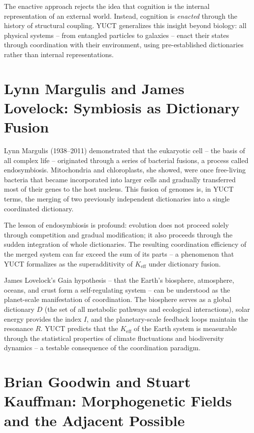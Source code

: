 \documentclass[12pt,a4paper]{article}
\begin{document}
	The enactive approach rejects the idea that cognition is the internal representation of an external world. Instead, cognition is \emph{enacted} through the history of structural coupling. YUCT generalizes this insight beyond biology: all physical systems -- from entangled particles to galaxies -- enact their states through coordination with their environment, using pre-established dictionaries rather than internal representations.
	
	\section{Lynn Margulis and James Lovelock: Symbiosis as Dictionary Fusion}
	
	Lynn Margulis (1938–2011) demonstrated that the eukaryotic cell -- the basis of all complex life -- originated through a series of bacterial fusions, a process called endosymbiosis. Mitochondria and chloroplasts, she showed, were once free-living bacteria that became incorporated into larger cells and gradually transferred most of their genes to the host nucleus. This fusion of genomes is, in YUCT terms, the merging of two previously independent dictionaries into a single coordinated dictionary.
	
	The lesson of endosymbiosis is profound: evolution does not proceed solely through competition and gradual modification; it also proceeds through the sudden integration of whole dictionaries. The resulting coordination efficiency of the merged system can far exceed the sum of its parts -- a phenomenon that YUCT formalizes as the superadditivity of \(K_{\mathrm{eff}}\) under dictionary fusion.
	
	James Lovelock's Gaia hypothesis -- that the Earth's biosphere, atmosphere, oceans, and crust form a self-regulating system -- can be understood as the planet-scale manifestation of coordination. The biosphere serves as a global dictionary \(D\) (the set of all metabolic pathways and ecological interactions), solar energy provides the index \(I\), and the planetary-scale feedback loops maintain the resonance \(R\). YUCT predicts that the \(K_{\mathrm{eff}}\) of the Earth system is measurable through the statistical properties of climate fluctuations and biodiversity dynamics -- a testable consequence of the coordination paradigm.
	
	\section{Brian Goodwin and Stuart Kauffman: Morphogenetic Fields and the Adjacent Possible}
	
\end{document}
